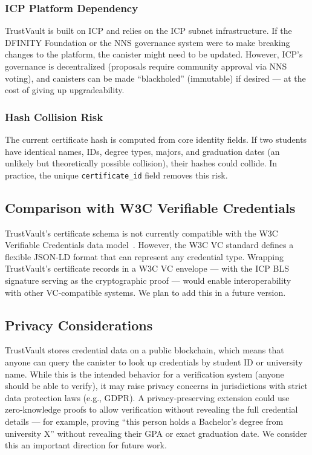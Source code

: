 \documentclass[conference]{IEEEtran}
\begin{document}
\subsubsection{ICP Platform Dependency}
TrustVault is built on ICP and relies on the ICP subnet infrastructure. If the DFINITY Foundation or the NNS governance system were to make breaking changes to the platform, the canister might need to be updated. However, ICP's governance is decentralized (proposals require community approval via NNS voting), and canisters can be made ``blackholed'' (immutable) if desired — at the cost of giving up upgradeability.

\subsubsection{Hash Collision Risk}
The current certificate hash is computed from core identity fields. If two students have identical names, IDs, degree types, majors, and graduation dates (an unlikely but theoretically possible collision), their hashes could collide. In practice, the unique \texttt{certificate\_id} field removes this risk.

\subsection{Comparison with W3C Verifiable Credentials}

TrustVault's certificate schema is not currently compatible with the W3C Verifiable Credentials data model~\cite{w3c2022vc}. However, the W3C VC standard defines a flexible JSON-LD format that can represent any credential type. Wrapping TrustVault's certificate records in a W3C VC envelope — with the ICP BLS signature serving as the cryptographic proof — would enable interoperability with other VC-compatible systems. We plan to add this in a future version.

\subsection{Privacy Considerations}

TrustVault stores credential data on a public blockchain, which means that anyone can query the canister to look up credentials by student ID or university name. While this is the intended behavior for a verification system (anyone should be able to verify), it may raise privacy concerns in jurisdictions with strict data protection laws (e.g., GDPR). A privacy-preserving extension could use zero-knowledge proofs to allow verification without revealing the full credential details — for example, proving ``this person holds a Bachelor's degree from university X'' without revealing their GPA or exact graduation date. We consider this an important direction for future work.
\end{document}
